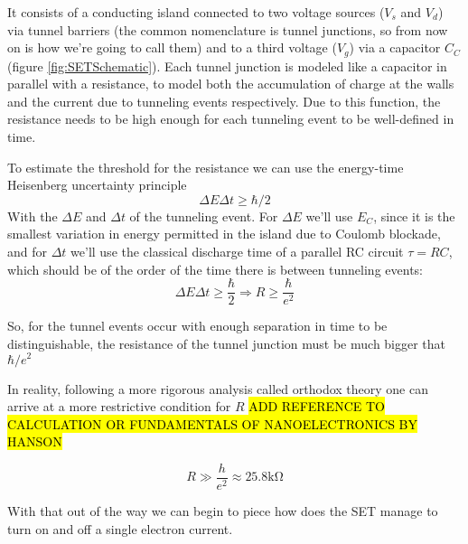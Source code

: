 \documentclass[../main.tex]{subfiles}
\begin{document}
It consists of a conducting island connected to two voltage sources (\(V_{s}\)
and \(V_{d}\)) via tunnel barriers (the common nomenclature is tunnel junctions,
so from now on is how we're going to call them) and to a third voltage
(\(V_{g}\)) via a capacitor \(C_{C}\) (figure \ref{fig:SETSchematic}). Each
tunnel junction is modeled like a capacitor in parallel with a resistance, to
model both the accumulation of charge at the walls and the current due to
tunneling events respectively. Due to this function, the resistance needs to be
high enough for each tunneling event to be well-defined in time.

To estimate the threshold for the resistance we can use the energy-time
Heisenberg uncertainty principle
\[\Delta E \Delta t \geq \hbar/2\]
With the \(\Delta E\) and \(\Delta t\) of the tunneling event. For \(\Delta E\)
we'll use \(E_{C}\), since it is the smallest variation in energy permitted in
the island due to Coulomb blockade, and for \(\Delta t\) we'll use the classical
discharge time of a parallel RC circuit \(\tau = RC\), which should be of the
order of the time there is between tunneling events:
\begin{equation*}
    \Delta E \Delta t \geq \frac{\hbar}{2} \Rightarrow R \geq \frac{\hbar}{e^2}
\end{equation*}

So, for the tunnel events occur with enough separation in time to be
distinguishable, the resistance of the tunnel junction must be much bigger
that \(\hbar/e^2\)

In reality, following a more rigorous analysis called orthodox theory one can
arrive at a more restrictive condition for \(R\) \hl{ADD REFERENCE TO CALCULATION OR
FUNDAMENTALS OF NANOELECTRONICS BY HANSON}

\begin{equation*}
\label{eq:RTunnelCond}
    R \gg \frac{h}{e^2} \approx 25.8\unit{\kilo\ohm}
\end{equation*}

With that out of the way we can begin to piece how does the SET manage to turn
on and off a single electron current.
\end{document}
